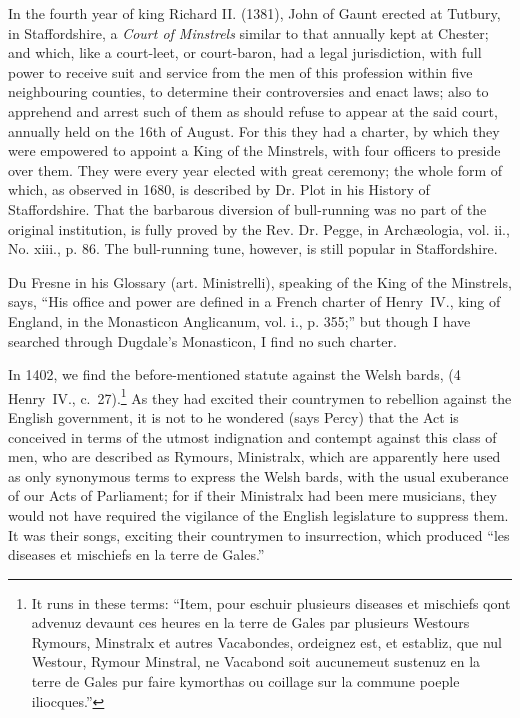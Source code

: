 In the fourth year of king Richard II. (1381), John of Gaunt erected at
Tutbury, in Staffordshire, a \textit{Court of Minstrels} similar to that annually kept at
Chester; and which, like a court-leet, or court-baron, had a legal jurisdiction,
with full power to receive suit and service from the men of this profession within
five neighbouring counties, to determine their controversies and enact laws; also
to apprehend and arrest such of them as should refuse to appear at the said court,
annually held on the 16th of August. For this they had a charter, by which
they were empowered to appoint a King of the Minstrels, with four officers to
preside over them. They were every year elected with great ceremony; the
whole form of which, as observed in 1680, is described by Dr. Plot in his History
of Staffordshire. That the barbarous diversion of bull-running was no part of the
original institution, is fully proved by the Rev. Dr. Pegge, in Archæologia, vol. ii.,
No. xiii., p. 86. The bull-running tune, however, is still popular in Staffordshire.

\pagebreak
{}

Du Fresne in his Glossary (art. Ministrelli), speaking of the King of the
Minstrels, says, “His office and power are defined in a French charter of
Henry~IV., king of England, in the Monasticon Anglicanum, vol. i., p. 355;”
but though I have searched through Dugdale’s Monasticon, I find no such
charter.


In 1402, we find the before-mentioned statute against the Welsh bards,%
(4 Henry~IV., c.~27).\footnote{
It runs in these terms: “Item, pour eschuir plusieurs
diseases et mischiefs qont advenuz devaunt ces heures en
la terre de Gales par plusieurs Westours Rymours,
Minstralx et autres Vacabondes, ordeignez est, et
establiz, que nul Westour, Rymour Minstral, ne Vacabond
soit aucunemeut sustenuz en la terre de Gales pur
faire kymorthas ou coillage sur la commune poeple
iliocques.”
} As they had excited their countrymen to rebellion
against the English government, it is not to he wondered (says Percy) that the
Act is conceived in terms of the utmost indignation and contempt against this
class of men, who are described as Rymours, Ministralx, which are apparently
here used as only synonymous terms to express the Welsh bards, with the usual
exuberance of our Acts of Parliament; for if their Ministralx had been mere
musicians, they would not have required the vigilance of the English legislature
to suppress them. It was their songs, exciting their countrymen to insurrection,
which produced “les diseases et mischiefs en la terre de Gales.”

